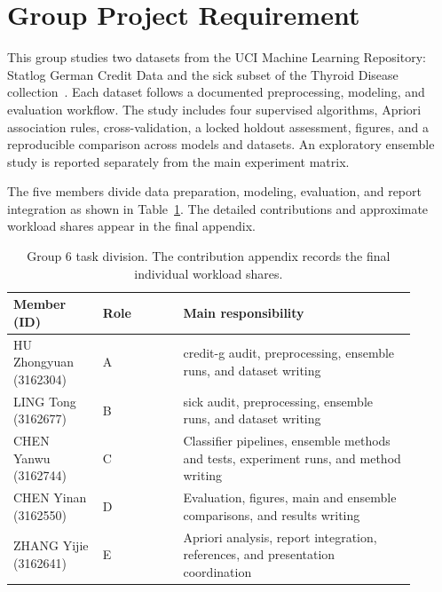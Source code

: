\section{Group Project Requirement}
\label{sec:requirement}

This group studies two datasets from the UCI Machine Learning Repository: Statlog German Credit Data and the sick subset of the Thyroid Disease collection~\cite{dua2019uci,uci_credit_g_1994,uci_thyroid_1986}. Each dataset follows a documented preprocessing, modeling, and evaluation workflow. The study includes four supervised algorithms, Apriori association rules, cross-validation, a locked holdout assessment, figures, and a reproducible comparison across models and datasets. An exploratory ensemble study is reported separately from the main experiment matrix.

The five members divide data preparation, modeling, evaluation, and report integration as shown in Table~\ref{tab:task-division}. The detailed contributions and approximate workload shares appear in the final appendix.

\begin{table}[htbp]
\centering
\small
\caption{Group 6 task division. The contribution appendix records the final individual workload shares.}
\label{tab:task-division}
\begin{tabular}{@{}p{0.20\linewidth}p{0.18\linewidth}p{0.52\linewidth}@{}}
\toprule
Member (ID) & Role & Main responsibility \\
\midrule
HU Zhongyuan (3162304) & A & credit-g audit, preprocessing, ensemble runs, and dataset writing \\
LING Tong (3162677) & B & sick audit, preprocessing, ensemble runs, and dataset writing \\
CHEN Yanwu (3162744) & C & Classifier pipelines, ensemble methods and tests, experiment runs, and method writing \\
CHEN Yinan (3162550) & D & Evaluation, figures, main and ensemble comparisons, and results writing \\
ZHANG Yijie (3162641) & E & Apriori analysis, report integration, references, and presentation coordination \\
\bottomrule
\end{tabular}
\end{table}

